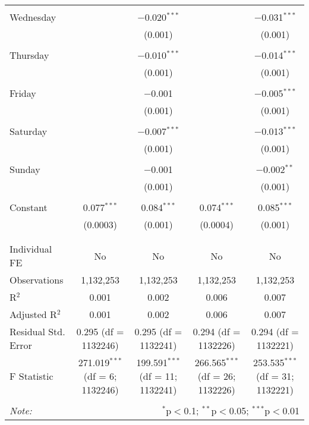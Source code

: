 \documentclass[
]{article}
\begin{document}
\begin{table}[!htbp]
{\begin{tabular}{@{\extracolsep{5pt}}lcccc}
  & & & & \\ 
 Wednesday &  & $-$0.020$^{***}$ &  & $-$0.031$^{***}$ \\ 
  &  & (0.001) &  & (0.001) \\ 
  & & & & \\ 
 Thursday &  & $-$0.010$^{***}$ &  & $-$0.014$^{***}$ \\ 
  &  & (0.001) &  & (0.001) \\ 
  & & & & \\ 
 Friday &  & $-$0.001 &  & $-$0.005$^{***}$ \\ 
  &  & (0.001) &  & (0.001) \\ 
  & & & & \\ 
 Saturday &  & $-$0.007$^{***}$ &  & $-$0.013$^{***}$ \\ 
  &  & (0.001) &  & (0.001) \\ 
  & & & & \\ 
 Sunday &  & $-$0.001 &  & $-$0.002$^{**}$ \\ 
  &  & (0.001) &  & (0.001) \\ 
  & & & & \\ 
 Constant & 0.077$^{***}$ & 0.084$^{***}$ & 0.074$^{***}$ & 0.085$^{***}$ \\ 
  & (0.0003) & (0.001) & (0.0004) & (0.001) \\ 
  & & & & \\ 
\hline \\[-1.8ex] 
Individual FE & No & No & No & No \\ 
Observations & 1,132,253 & 1,132,253 & 1,132,253 & 1,132,253 \\ 
R$^{2}$ & 0.001 & 0.002 & 0.006 & 0.007 \\ 
Adjusted R$^{2}$ & 0.001 & 0.002 & 0.006 & 0.007 \\ 
Residual Std. Error & 0.295 (df = 1132246) & 0.295 (df = 1132241) & 0.294 (df = 1132226) & 0.294 (df = 1132221) \\ 
F Statistic & 271.019$^{***}$ (df = 6; 1132246) & 199.591$^{***}$ (df = 11; 1132241) & 266.565$^{***}$ (df = 26; 1132226) & 253.535$^{***}$ (df = 31; 1132221) \\ 
\hline 
\hline \\[-1.8ex] 
\textit{Note:}  & \multicolumn{4}{r}{$^{*}$p$<$0.1; $^{**}$p$<$0.05; $^{***}$p$<$0.01} \\ 
\end{tabular}
} 
\end{table} 
\newpage
\end{document}
